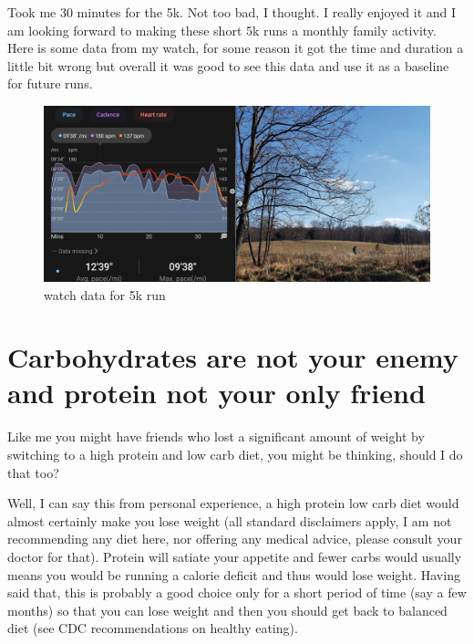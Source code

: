 \documentclass[
  oneside]{book}
\begin{document}
Took me 30 minutes for the 5k. Not too bad, I thought. I really enjoyed it and I am looking forward to making these short 5k runs a monthly family activity. Here is some data from my watch, for some reason it got the time and duration a little bit wrong but overall it was good to see this data and use it as a baseline for future runs.

\begin{figure}
\centering
\includegraphics{pictures/5k.png}
\caption{watch data for 5k run}
\end{figure}

\hypertarget{carbohydrates-are-not-your-enemy-and-protein-not-your-only-friend}{%
\section{Carbohydrates are not your enemy and protein not your only friend}\label{carbohydrates-are-not-your-enemy-and-protein-not-your-only-friend}}

Like me you might have friends who lost a significant amount of weight by switching to a high protein and low carb diet, you might be thinking, should I do that too?

Well, I can say this from personal experience, a high protein low carb diet would almost certainly make you lose weight (all standard disclaimers apply, I am not recommending any diet here, nor offering any medical advice, please consult your doctor for that). Protein will satiate your appetite and fewer carbs would usually means you would be running a calorie deficit and thus would lose weight. Having said that, this is probably a good choice only for a short period of time (say a few months) so that you can lose weight and then you should get back to balanced diet (see CDC recommendations on healthy eating).
\end{document}
